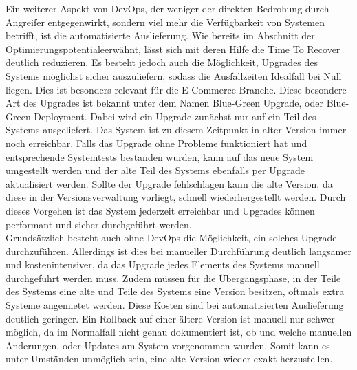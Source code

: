 Ein weiterer Aspekt von DevOps, der weniger der direkten Bedrohung durch Angreifer entgegenwirkt, sondern viel mehr die Verfügbarkeit von Systemen betrifft, ist die automatisierte Auslieferung. Wie bereits im Abschnitt der \glqq Optimierungspotentiale\grqq erwähnt, lässt sich mit deren Hilfe die Time To Recover deutlich reduzieren. Es besteht jedoch auch die Möglichkeit, Upgrades des Systems möglichst sicher auszuliefern, sodass die Ausfallzeiten Idealfall bei Null liegen. Dies ist besonders relevant für die E-Commerce Branche. Diese besondere Art des Upgrades ist bekannt unter dem Namen \glqq Blue-Green Upgrade\grqq, oder \glqq Blue-Green Deployment\grqq. \parencite[Vgl.][S. 103 f.]{bass:2015} Dabei wird ein Upgrade zunächst nur auf ein Teil des Systems ausgeliefert. Das System ist zu diesem Zeitpunkt in alter Version immer noch erreichbar. Falls das Upgrade ohne Probleme funktioniert hat und entsprechende Systemtests bestanden wurden, kann auf das neue System umgestellt werden und der alte Teil des Systems ebenfalls per Upgrade aktualisiert werden. Sollte der Upgrade fehlschlagen kann die alte Version, da diese in der Versionsverwaltung vorliegt, schnell wiederhergestellt werden. Durch dieses Vorgehen ist das System jederzeit erreichbar und Upgrades können performant und sicher durchgeführt werden.\\
Grundsätzlich besteht auch ohne DevOps die Möglichkeit, ein solches Upgrade durchzuführen. Allerdings ist dies bei manueller Durchführung deutlich langsamer und kostenintensiver, da das Upgrade jedes Elements des Systems manuell durchgeführt werden muss. Zudem müssen für die Übergangsphase, in der Teile des Systems eine alte und Teile des Systems eine Version besitzen, oftmals extra Systeme angemietet werden. Diese Kosten sind bei automatisierten Auslieferung deutlich geringer. Ein Rollback auf einer ältere Version ist manuell nur schwer möglich, da im Normalfall nicht genau dokumentiert ist, ob und welche manuellen Änderungen, oder Updates am System vorgenommen wurden. Somit kann es unter Umständen unmöglich sein, eine alte Version wieder exakt herzustellen.\\

